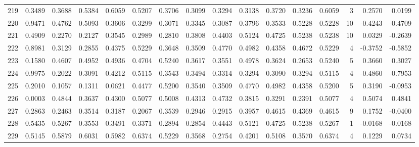 \begin{tabular}{lrrrrrrrrrrrrrrr}
219 &      0.3489 &  0.3688 &  0.5384 &  0.6059 &  0.5207 &  0.3706 &  0.3099 &  0.3294 &  0.3138 &  0.3720 &   0.3236 &     0.6059 &      3 &                    0.2570 &                     0.0199 \\
220 &      0.9471 &  0.4762 &  0.5093 &  0.3606 &  0.3299 &  0.3071 &  0.3345 &  0.3087 &  0.3796 &  0.3533 &   0.5228 &     0.5228 &     10 &                   -0.4243 &                    -0.4709 \\
221 &      0.4909 &  0.2270 &  0.2127 &  0.3545 &  0.2989 &  0.2810 &  0.3808 &  0.4403 &  0.5124 &  0.4725 &   0.5238 &     0.5238 &     10 &                    0.0329 &                    -0.2639 \\
222 &      0.8981 &  0.3129 &  0.2855 &  0.4375 &  0.5229 &  0.3648 &  0.3509 &  0.4770 &  0.4982 &  0.4358 &   0.4672 &     0.5229 &      4 &                   -0.3752 &                    -0.5852 \\
223 &      0.1580 &  0.4607 &  0.4952 &  0.4936 &  0.4704 &  0.5240 &  0.3617 &  0.3551 &  0.4978 &  0.3624 &   0.2653 &     0.5240 &      5 &                    0.3660 &                     0.3027 \\
224 &      0.9975 &  0.2022 &  0.3091 &  0.4212 &  0.5115 &  0.3543 &  0.3494 &  0.3314 &  0.3294 &  0.3090 &   0.3294 &     0.5115 &      4 &                   -0.4860 &                    -0.7953 \\
225 &      0.2010 &  0.1057 &  0.1311 &  0.0621 &  0.4477 &  0.5200 &  0.3540 &  0.3509 &  0.4770 &  0.4982 &   0.4358 &     0.5200 &      5 &                    0.3190 &                    -0.0953 \\
226 &      0.0003 &  0.4844 &  0.3637 &  0.4300 &  0.5077 &  0.5008 &  0.4313 &  0.4732 &  0.3815 &  0.3291 &   0.2391 &     0.5077 &      4 &                    0.5074 &                     0.4841 \\
227 &      0.2863 &  0.2463 &  0.3514 &  0.3187 &  0.2067 &  0.3539 &  0.2946 &  0.2915 &  0.3957 &  0.4615 &   0.4369 &     0.4615 &      9 &                    0.1752 &                    -0.0400 \\
228 &      0.5435 &  0.5267 &  0.3553 &  0.3491 &  0.3371 &  0.2894 &  0.2854 &  0.4443 &  0.5121 &  0.4725 &   0.5238 &     0.5267 &      1 &                   -0.0168 &                    -0.0168 \\
229 &      0.5145 &  0.5879 &  0.6031 &  0.5982 &  0.6374 &  0.5229 &  0.3568 &  0.2754 &  0.4201 &  0.5108 &   0.3570 &     0.6374 &      4 &                    0.1229 &                     0.0734 \\

\end{tabular}
